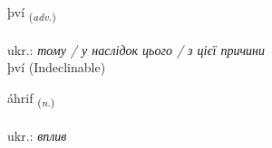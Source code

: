 \documentclass[frontgrid, backgrid]{flacards}\usepackage[]{graphicx}\usepackage[]{xcolor}
\begin{document}
{því \small{\textsubscript{(\textit{adv.})}} \\[1ex]
\textphonetic{[θviː]} \\
ukr.: \emph{тому / у наслідок цього / з цієї причини} \\  [2ex]
því (Indeclinable)}

\renewcommand{\flhead}{\vskip5pt \fboxsep=0pt {\small\bfseries\footnotesize Nafnorð | іменник}}
\renewcommand{\fcfoot}{\vskip5pt \fboxsep=0pt \hspace{2pt}{\small\bfseries\footnotesize 1K}}

\renewcommand{\blhead}{\vskip5pt {\small\bfseries\footnotesize Nafnorð | іменник }}
\renewcommand{\bcfoot}{\vskip5pt \hspace{2pt}{\small\bfseries\footnotesize 1K}}


{áhrif \small{\textsubscript{(\textit{n.})}} \\[1ex] %
\textphonetic{[auːr̥ɪv]} \\
ukr.: \emph{вплив} \\  [2ex]
\renewcommand*{\arraystretch}{0.8}
}

\renewcommand{\flhead}{\vskip5pt \fboxsep=0pt {\small\bfseries\footnotesize Sagnorð | дієслово}}
\renewcommand{\fcfoot}{\vskip5pt \fboxsep=0pt \hspace{2pt}{\small\bfseries\footnotesize 1K}}

\renewcommand{\blhead}{\vskip5pt {\small\bfseries\footnotesize Sagnorð | дієслово }}
\renewcommand{\bcfoot}{\vskip5pt \hspace{2pt}{\small\bfseries\footnotesize 1K}}
\end{document}
